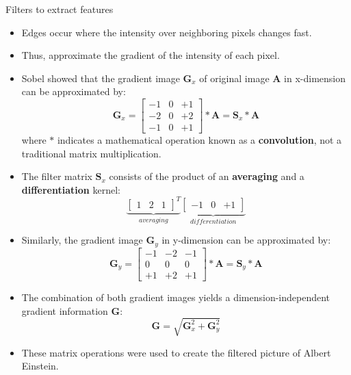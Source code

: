 \begin{vbframe}{Filters to extract features}
\begin{itemize}
\item Edges occur where the intensity over neighboring pixels changes fast.
\item Thus, approximate the gradient of the intensity of each pixel.
\item Sobel showed that the gradient image $\textbf{G}_x$ of original image $\textbf{A}$ in x-dimension  can be approximated by:
$$ \textbf{G}_x = 
\begin{bmatrix}
-1 & 0 & +1 \\
-2 & 0 & +2 \\
-1 & 0 & +1 
\end{bmatrix} * \textbf{A} = \textbf{S}_x * \textbf{A}
$$
where $*$ indicates a mathematical operation known as a \textbf{convolution}, not a traditional matrix multiplication.
\item The filter matrix $\textbf{S}_x$ consists of the product of an \textbf{averaging} and a \textbf{differentiation} kernel: 
$$
\underbrace{\begin{bmatrix}
1 & 2 & 1   
\end{bmatrix}^{T}}_{averaging}
\underbrace{\begin{bmatrix}
-1 & 0 & +1   
\end{bmatrix}}_{differentiation}
$$
\end{itemize}
\framebreak
    \begin{itemize}
        \item Similarly, the gradient image $\textbf{G}_y$ in y-dimension can be approximated by:
        $$
            \textbf{G}_y = 
            \begin{bmatrix}
                -1 & -2 & -1  \\
                0 & 0 & 0 \\
                +1 & +2 & +1
            \end{bmatrix} * \textbf{A} = \textbf{S}_y * \textbf{A}
        $$
        \item The combination of both gradient images yields a dimension-independent gradient information $\textbf{G}$:
        $$
            \textbf{G} = \sqrt{\textbf{G}_x^2 + \textbf{G}_y^2}
        $$
        \item These matrix operations were used to create the filtered picture of Albert Einstein.
    \end{itemize}
\end{vbframe}

